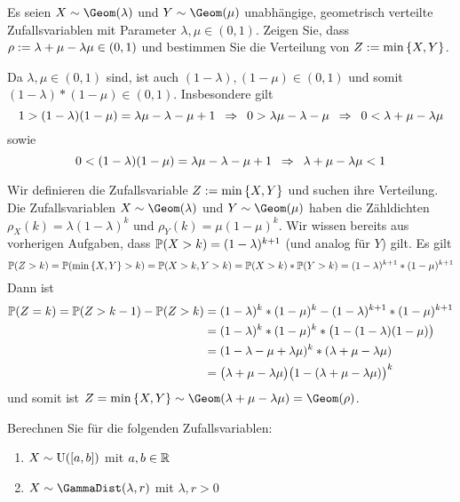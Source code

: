 \begin{exercisePage}
	\begin{homework}
		Es seien $X \sim \Geom(\lambda)$ und $Y \sim \Geom(\mu)$ unabhängige, geometrisch verteilte Zufallsvariablen mit Parameter $\lambda, \mu \in (0,1)$. Zeigen Sie, dass $\rho \defeq \lambda + \mu - \lambda \mu \in (0,1)$ und bestimmen Sie die Verteilung von $Z \defeq \min \menge{X,Y}$.
	\end{homework}

	Da $\lambda, \mu \in (0,1)$ sind, ist auch $(1-\lambda), (1-\mu) \in (0,1)$ und somit $(1 - \lambda) * (1 - \mu) \in (0,1)$.  Insbesondere gilt
	\begin{equation*}
		1 > (1-\lambda)(1-\mu) = \lambda \mu - \lambda - \mu + 1 \follows 0 > \lambda \mu - \lambda - \mu \follows 0 < \lambda + \mu - \lambda \mu
	\end{equation*}
	sowie
	\begin{equation*}
		0 < (1-\lambda)(1-\mu) = \lambda \mu - \lambda - \mu + 1  \follows \lambda + \mu - \lambda \mu < 1
	\end{equation*}
	
	Wir definieren die Zufallsvariable $Z \defeq \min \menge{X,Y}$ und suchen ihre Verteilung. Die Zufallsvariablen $X \sim \Geom(\lambda)$ und $Y \sim \Geom(\mu)$ haben die Zähldichten $\rho_X(k) = \lambda(1-\lambda)^k$ und $\rho_Y(k) = \mu (1-\mu)^k$. Wir wissen bereits aus vorherigen Aufgaben, dass $\P(X > k) = (1-\lambda)^{k+1}$ (und analog für $Y$) gilt. Es gilt
	\begin{equation*}
		\P(Z > k) = \P(\min\menge{X,Y} > k) = \P(X>k,Y>k) = \P(X>k) * \P(Y>k) = (1-\lambda)^{k+1} * (1-\mu)^{k+1}
	\end{equation*}
	Dann ist
	\begin{equation*}
	\begin{aligned}
		\P(Z = k) = \P(Z > k-1) - \P(Z>k) 
		&= (1-\lambda)^k * (1-\mu)^k - (1-\lambda)^{k+1} * (1-\mu)^{k+1} \\
		&= (1-\lambda)^k * (1-\mu)^k * \big( 1 - (1-\lambda)(1-\mu) \big) \\
		&= (1- \lambda -\mu + \lambda \mu)^k * (\lambda + \mu - \lambda \mu) \\
		&= \big(\lambda + \mu - \lambda \mu \big) \big( 1- (\lambda + \mu - \lambda \mu) \big)^k
	\end{aligned}
	\end{equation*}
	und somit ist $Z = \min \menge{X,Y} \sim \Geom(\lambda + \mu - \lambda \mu) = \Geom(\rho)$.
	\begin{homework}
		Berechnen Sie \EW für die folgenden Zufallsvariablen:
		\begin{enumerate}[leftmargin=*, label=(\alph*), nolistsep, topsep=-\parskip]
			\item $X \sim \Uni([a,b])$ mit $a,b \in \R$
			\item $X \sim \GammaDist(\lambda, r)$ mit $\lambda,r > 0$
		\end{enumerate}
	\end{homework}


\end{exercisePage}
